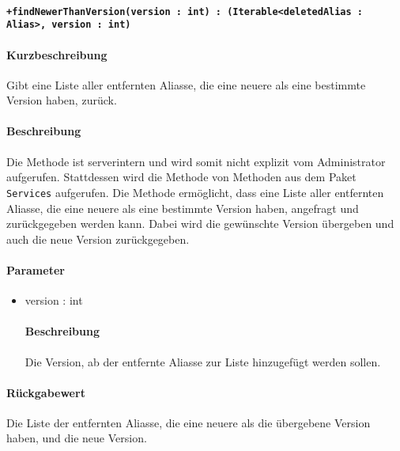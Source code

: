 \paragraph*{\texttt{+findNewerThanVersion(version : int) : (Iterable<deletedAlias : Alias>, version : int)}}%
\paragraph*{Kurzbeschreibung}
Gibt eine Liste aller entfernten Aliasse, die eine neuere als eine bestimmte Version haben, zurück.
\paragraph*{Beschreibung}
Die Methode ist serverintern und wird somit nicht explizit vom Administrator aufgerufen.
Stattdessen wird die Methode von Methoden aus dem Paket \texttt{Services} aufgerufen.
Die Methode ermöglicht, dass eine Liste aller entfernten Aliasse, die eine neuere als eine bestimmte Version haben, angefragt und zurückgegeben werden kann.
Dabei wird die gewünschte Version übergeben und auch die neue Version zurückgegeben.
\paragraph*{Parameter}
\begin{itemize}
    \item version : int
    		\paragraph*{Beschreibung}
    		Die Version, ab der entfernte Aliasse zur Liste hinzugefügt werden sollen.
\end{itemize}
\paragraph*{Rückgabewert}
Die Liste der entfernten Aliasse, die eine neuere als die übergebene Version haben, und die neue Version.
